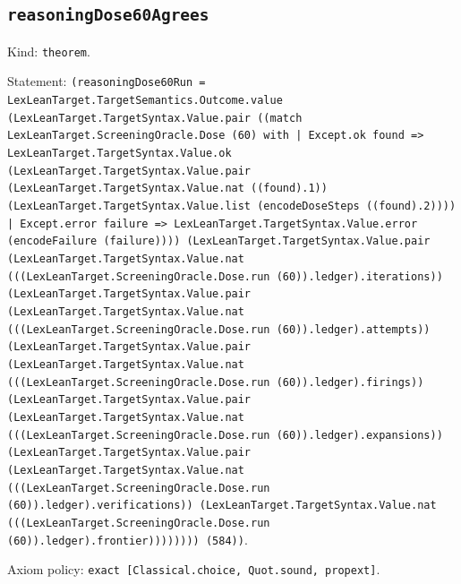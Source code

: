 \documentclass[11pt]{article}
\begin{document}
\subsection*{\texttt{reasoningDose60Agrees}}
\noindent Kind: \texttt{theorem}.\par
\noindent Statement: \texttt{(reasoningDose60Run = LexLeanTarget.TargetSemantics.Outcome.value (LexLeanTarget.TargetSyntax.Value.pair ((match LexLeanTarget.ScreeningOracle.Dose (60) with | Except.ok found => LexLeanTarget.TargetSyntax.Value.ok (LexLeanTarget.TargetSyntax.Value.pair (LexLeanTarget.TargetSyntax.Value.nat ((found).1)) (LexLeanTarget.TargetSyntax.Value.list (encodeDoseSteps ((found).2)))) | Except.error failure => LexLeanTarget.TargetSyntax.Value.error (encodeFailure (failure)))) (LexLeanTarget.TargetSyntax.Value.pair (LexLeanTarget.TargetSyntax.Value.nat (((LexLeanTarget.ScreeningOracle.Dose.run (60)).ledger).iterations)) (LexLeanTarget.TargetSyntax.Value.pair (LexLeanTarget.TargetSyntax.Value.nat (((LexLeanTarget.ScreeningOracle.Dose.run (60)).ledger).attempts)) (LexLeanTarget.TargetSyntax.Value.pair (LexLeanTarget.TargetSyntax.Value.nat (((LexLeanTarget.ScreeningOracle.Dose.run (60)).ledger).firings)) (LexLeanTarget.TargetSyntax.Value.pair (LexLeanTarget.TargetSyntax.Value.nat (((LexLeanTarget.ScreeningOracle.Dose.run (60)).ledger).expansions)) (LexLeanTarget.TargetSyntax.Value.pair (LexLeanTarget.TargetSyntax.Value.nat (((LexLeanTarget.ScreeningOracle.Dose.run (60)).ledger).verifications)) (LexLeanTarget.TargetSyntax.Value.nat (((LexLeanTarget.ScreeningOracle.Dose.run (60)).ledger).frontier)))))))) (584))}.\par
\noindent Axiom policy: \texttt{exact [Classical.choice, Quot.sound, propext]}.\par
\end{document}
